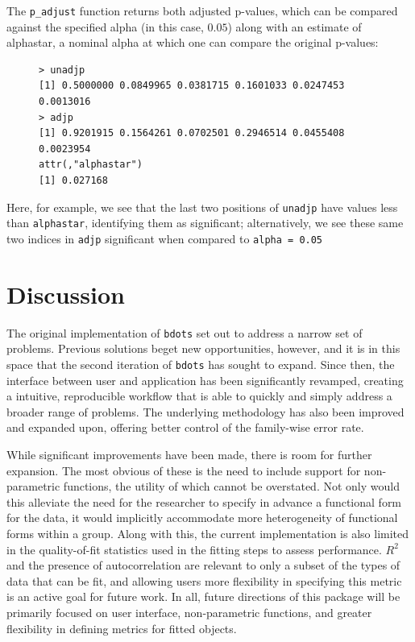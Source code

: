 \documentclass{article}
\newcommand{\xt}{\texttt}%
\begin{document}
The \xt{p\_adjust} function returns both adjusted p-values, which can be compared against the specified alpha (in this case, $0.05$) along with an estimate of alphastar, a nominal alpha at which one can compare the original p-values:

\begin{singlespace}
\begin{figure}[H]
\centering
\begin{BVerbatim}
> unadjp
[1] 0.5000000 0.0849965 0.0381715 0.1601033 0.0247453 0.0013016
> adjp
[1] 0.9201915 0.1564261 0.0702501 0.2946514 0.0455408 0.0023954
attr(,"alphastar")
[1] 0.027168
\end{BVerbatim}
\end{figure}
\end{singlespace}

Here, for example, we see that the last two positions of \xt{unadjp} have values less than \xt{alphastar}, identifying them as significant; alternatively, we see these same two indices in \xt{adjp} significant when compared to \xt{alpha = 0.05}

\section{Discussion}


The original implementation of \xt{bdots} set out to address a narrow set of problems. Previous solutions beget new opportunities, however, and it is in this space that the second iteration of \xt{bdots} has sought to expand. Since then, the interface between user and application has been significantly revamped, creating a intuitive, reproducible workflow that is able to quickly and simply address a broader range of problems. The underlying methodology has also been improved and expanded upon, offering better control of the family-wise error rate.

While significant improvements have been made, there is room for further expansion. The most obvious of these is the need to include support for non-parametric functions, the utility of which cannot be overstated. Not only would this alleviate the need for the researcher to specify in advance a functional form for the data, it would implicitly accommodate more heterogeneity of functional forms within a group. Along with this, the current implementation is also limited in the quality-of-fit statistics used in the fitting steps to assess performance. $R^2$ and the presence of autocorrelation are relevant to only a subset of the types of data that can be fit, and allowing users more flexibility in specifying this metric is an active goal for future work. In all, future directions of this package will be primarily focused on user interface, non-parametric functions, and greater flexibility in defining metrics for fitted objects.
\end{document}
